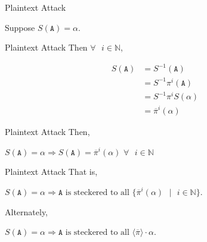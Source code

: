 \documentclass[hyphens,aspectratio=169]{beamer}
\begin{document}

\begin{frame}[fragile]{Plaintext Attack}
	\huge
	\begin{center}
		Suppose $S(\texttt{A})= \alpha$.
	\end{center}
\end{frame}

\begin{frame}[fragile]{Plaintext Attack}
	Then $\forall\text{ }i\in\mathbb{N}$,
	\begin{center}
        \begin{align*}
			S(\texttt{A}) & = S^{-1}(\texttt{A})
			\\&= S^{-1} \pi^i(\texttt{A})
            \\&= S^{-1} \pi^iS(\alpha)
            \\&= \overline\pi^{i}(\alpha)
		\end{align*}
	\end{center}
\end{frame}

\begin{frame}[fragile]{Plaintext Attack}
	Then,
	\begin{center}
		$S(\texttt{A}) = \alpha \Rightarrow S(\texttt{A}) =
			\overline{\pi}^i(\alpha)\text{
			}\forall\text{ }i\in\mathbb{N}$
	\end{center}
\end{frame}

\begin{frame}[fragile]{Plaintext Attack}
	That is,
	\begin{center}
		$S(\texttt{A}) = \alpha \Rightarrow \texttt{A} \text{ is steckered to all } \{\overline{\pi}^i(\alpha)\text{ }\vert\text{ }i\in\mathbb{N}\}$.
	\end{center}
	Alternately,
	\begin{center}
		$S(\texttt{A}) = \alpha \Rightarrow \texttt{A}\text{ is steckered to all }\langle\overline{\pi}\rangle\cdot{\alpha}$.
	\end{center}
\end{frame}
\end{document}
